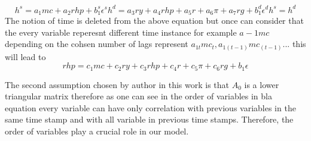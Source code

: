 \[ 
h^s = a_1 mc + a_2 rhp + b_1^s \epsilon^s
h^d = a_3 ry + a_4 rhp + a_5 r + a_6 \pi + a_7 rg  + b_1^d \epsilon^d
h^s = h^d
\]
The notion of time is deleted from the above equation but once can consider that the every variable reperesnt different time instance for example $a-1 mc$ depending on the cohsen number of lags represent $a_{1t} mc_{t} ,  a_{1(t-1)} mc_{(t-1)} ...  $
this will lead to 
\[
 rhp  = c_1 mc+  c_2 ry + c_3 rhp  + c_4 r + c_5 \pi + c_6 rg  + b_1 \epsilon
\]

The second assumption chosen by author in this work is that $A_0$ is a lower triangular matrix therefore as one can see in the order of variables in bla equation every variable can have only correlation with previous variables in the same time stamp and with all variable in previous time stamps. Therefore, the order of variables play a crucial role in our model. 



